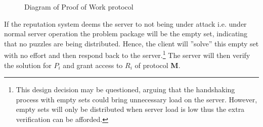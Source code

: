 \begin{figure}[H]
	\begin{center}
		 \vspace{10pt}
		\caption{Diagram of Proof of Work protocol}\label{tab:protocol}
	 \end{center}
\end{figure}
If the reputation system deems the server to not being under attack i.e. under normal server operation the problem package will be the empty set, indicating that no puzzles are being distributed.
Hence, the client will ''solve'' this empty set with no effort and then respond back to the server.\footnote{This design decision may be questioned, arguing that the handshaking process with empty sets could bring unnecessary load on the server.
However, empty sets will only be distributed when server load is low thus the extra verification can be afforded.}
The server will then verify the solution for $P_i$ and grant access to $R_i$ of protocol \textbf{M}.

